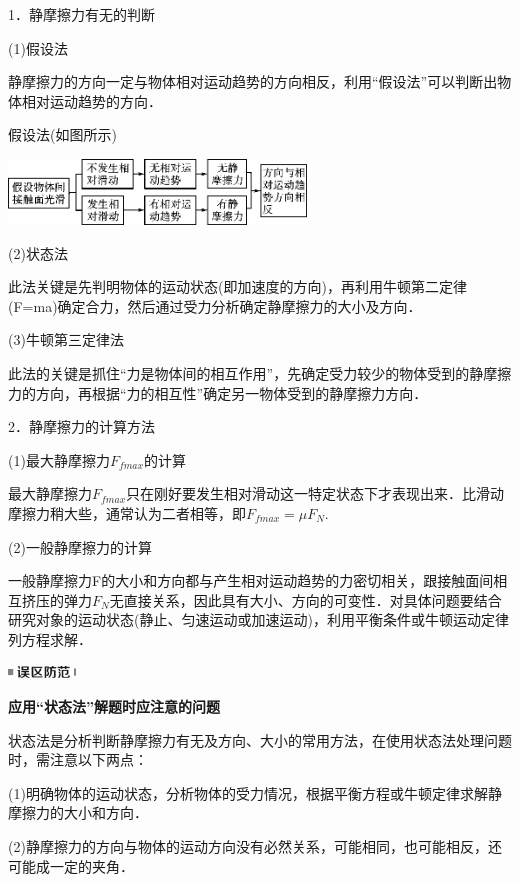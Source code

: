 \documentclass[cn,10.5pt,chinese,mac,chinesefont=founder]{elegantbook}
\begin{document}
1．静摩擦力有无的判断

(1)假设法

静摩擦力的方向一定与物体相对运动趋势的方向相反，利用``假设法''可以判断出物体相对运动趋势的方向．

假设法(如图所示)

\begin{center}\includegraphics[width=3.11458in,height=0.6875in]{media/image48.png}\end{center}

(2)状态法

此法关键是先判明物体的运动状态(即加速度的方向)，再利用牛顿第二定律(F=ma)确定合力，然后通过受力分析确定静摩擦力的大小及方向．

(3)牛顿第三定律法

此法的关键是抓住``力是物体间的相互作用''，先确定受力较少的物体受到的静摩擦力的方向，再根据``力的相互性''确定另一物体受到的静摩擦力方向．

2．静摩擦力的计算方法

(1)最大静摩擦力$F_{fmax}$的计算

最大静摩擦力$F_{fmax}$只在刚好要发生相对滑动这一特定状态下才表现出来．比滑动摩擦力稍大些，通常认为二者相等，即$F_{fmax}=\mu F_N$.　

(2)一般静摩擦力的计算

一般静摩擦力F的大小和方向都与产生相对运动趋势的力密切相关，跟接触面间相互挤压的弹力$F_N$无直接关系，因此具有大小、方向的可变性．对具体问题要结合研究对象的运动状态(静止、匀速运动或加速运动)，利用平衡条件或牛顿运动定律列方程求解．



\begin{center}\includegraphics[width=0.70833in,height=0.125in]{media/image34.png}

\textbf{应用``状态法''解题时应注意的问题}
\end{center}


状态法是分析判断静摩擦力有无及方向、大小的常用方法，在使用状态法处理问题时，需注意以下两点：

(1)明确物体的运动状态，分析物体的受力情况，根据平衡方程或牛顿定律求解静摩擦力的大小和方向．

(2)静摩擦力的方向与物体的运动方向没有必然关系，可能相同，也可能相反，还可能成一定的夹角．
\newpage
\end{document}
